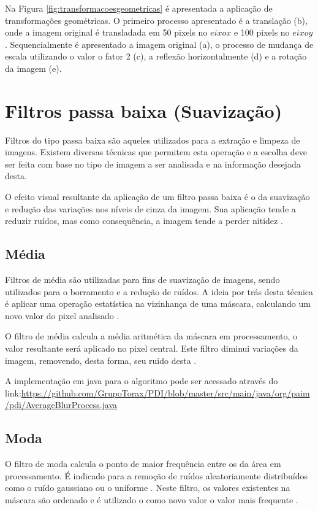\documentclass[
	12pt,				%
	oneside,			%
	a4paper,			%
	english,			%
	french,				%
	spanish,			%
	brazil,				%
	]{abntex2}
\begin{document}
Na Figura \ref{fig:transformacoesgeometricas} é apresentada a aplicação de transformações geométricas. O primeiro processo apresentado é a translação (b), onde a imagem original é transladada em 50 pixels no \(eixo x\) e 100 pixels no \(eixo y\). Sequencialmente é apresentado a imagem original (a), o processo de mudança de escala utilizando o valor o fator 2 (c), a reflexão horizontalmente (d) e a rotação da imagem (e). 

\section{Filtros passa baixa (Suavização)}
Filtros do tipo passa baixa são aqueles utilizados para a extração e limpeza de imagens. Existem diversas técnicas que permitem esta operação e a escolha deve ser feita com base no tipo de imagem a ser analisada e na informação desejada desta. 

O efeito visual resultante da aplicação de um filtro passa baixa é o da suavização e redução das variações nos níveis de cinza da imagem. Sua aplicação tende a reduzir ruídos, mas como consequência, a imagem tende a perder nitidez \cite{conciAzevedoLeta:2008}.

\subsection{Média}
Filtros de média são utilizadas para fins de suavização de imagens, sendo utilizados para o borramento e a redução de ruídos. A ideia por trás desta técnica é aplicar uma operação estatística na vizinhança de uma máscara, calculando um novo valor do pixel analisado \cite{gonzalesWoods:2008}. 

O filtro de média calcula a média aritmética da máscara em processamento, o valor resultante será aplicado no pixel central. Este filtro diminui variações da imagem, removendo, desta forma, seu ruído desta \cite{gonzalesWoods:2008}.

A implementação em java para o algoritmo pode ser acessado através do link:\url{https://github.com/GrupoTorax/PDI/blob/master/src/main/java/org/paim/pdi/AverageBlurProcess.java} 

\subsection{Moda}
O filtro de moda calcula o ponto de maior frequência entre os da área em processamento. É indicado para a remoção de ruídos aleatoriamente distribuídos como o ruído gaussiano ou o uniforme \cite{gonzalesWoods:2008}. Neste filtro, os valores existentes na máscara são ordenado e é utilizado o como novo valor o valor mais frequente \cite{conciAzevedoLeta:2008}.
\end{document}

